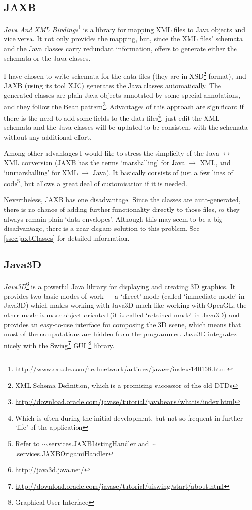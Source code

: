 \subsection{JAXB}
\emph{Java And XML Bindings}\footnote{\url{http://www.oracle.com/technetwork/articles/javase/index-140168.html}} is a library for mapping XML files to Java objects and vice versa. It not only provides the mapping, but, since the XML files' schemata and the Java classes carry redundant information, offers to generate either the schemata or the Java classes.

I have chosen to write schemata for the data files (they are in XSD\footnote{XML Schema Definition, which is a promising successor of the old DTDs} format),
and JAXB (using its tool XJC) generates the Java classes automatically. The generated classes are plain Java objects annotated by some special annotations, and they follow the Bean pattern\footnote{\url{http://download.oracle.com/javase/tutorial/javabeans/whatis/index.html}}.  Advantages of this approach are significant if there is the need to add some fields to the data files\footnote{Which is often during the initial development, but not so frequent in further `life' of the application}, just edit the XML schemata and the Java classes will be updated to be consistent with the schemata without any additional effort.

Among other advantages I would like to stress the simplicity of the Java $\leftrightarrow$ XML conversion (JAXB has the terms `marshalling' for Java $\rightarrow$ XML, and `unmarshalling' for XML $\rightarrow$ Java). It basically consists of just a few lines of code\footnote{Refer to $\sim$.services.JAXBListingHandler and $\sim$.services.JAXBOrigamiHandler}, but allows a great deal of customisation if it is needed.

Nevertheless, JAXB has one disadvantage. Since the classes are auto-generated,
there is no chance of adding further functionality directly to those files, so they always remain plain `data envelopes'.  Although this may seem to be a big disadvantage, there is a near elegant solution to this problem.  See \ref{ssec:jaxbClasses} for detailed information.

\subsection{Java3D}
\emph{Java3D}\footnote{\url{http://java3d.java.net/}} is a powerful Java library for displaying and creating 3D graphics. It provides two basic modes of work --- a `direct' mode (called `immediate mode' in Java3D) which makes working
with Java3D much like working with OpenGL; the other mode is more object-oriented (it is called `retained mode' in Java3D) and provides an easy-to-use interface for composing the 3D scene, which means that most of the computations are hidden from the programmer. Java3D integrates nicely with the Swing\footnote{\url{http://download.oracle.com/javase/tutorial/uiswing/start/about.html}} GUI \footnote{ Graphical User Interface} library.

